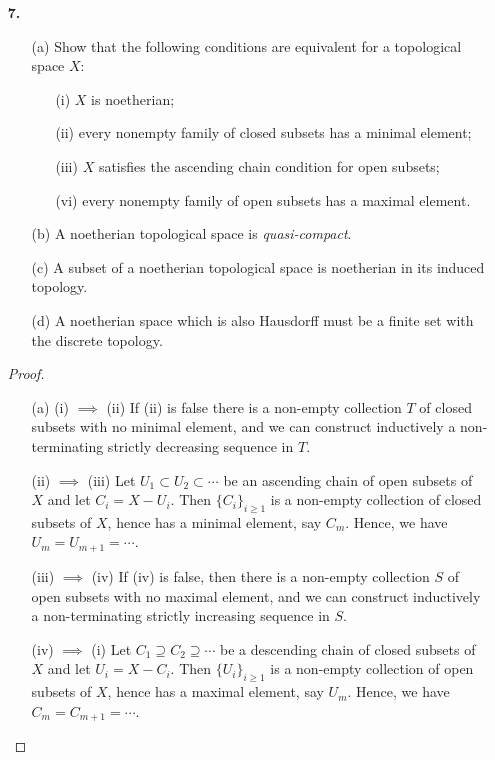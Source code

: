 \documentclass{article}
\begin{document}
\begin{enumerate} [label=\textbf{\arabic*.}, leftmargin=0em]
\item[\textbf{7.}]
\begin{itemize}
    \item[(a)] Show that the following conditions are equivalent for a topological space $X$:
    \begin{itemize}
        \item[(i)] $X$ is noetherian;
        \item[(ii)] every nonempty family of closed subsets has a minimal element;
        \item[(iii)] $X$ satisfies the ascending chain condition for open subsets;
        \item[(vi)] every nonempty family of open subsets has a maximal element.
    \end{itemize}

    \item[(b)] A noetherian topological space is \textit{quasi-compact}.

    \item[(c)] A subset of a noetherian topological space is noetherian in its induced topology.

    \item[(d)] A noetherian space which is also Hausdorff must be a finite set with the discrete topology.
\end{itemize}

\begin{proof} $ $ \vspace{0pt}
   \begin{itemize} [leftmargin=0cm]
    \item[(a)] (i) $\implies$ (ii) If (ii) is false there is a non-empty collection $T$ of closed subsets with no minimal element, and we can construct inductively a non-terminating strictly decreasing sequence in $T$.

    (ii) $\implies$ (iii) Let $U_1 \subset U_2 \subset \cdots$ be an ascending chain of open subsets of $X$ and let $C_i = X - U_i$. Then $\{ C_i \}_{i \geq 1}$ is a non-empty collection of closed subsets of $X$, hence has a minimal element, say $C_m$. Hence, we have $U_m = U_{m + 1} = \cdots$.

    (iii) $\implies$ (iv) If (iv) is false, then there is a non-empty collection $S$ of open subsets with no maximal element, and we can construct inductively a non-terminating strictly increasing sequence in $S$.

    (iv) $\implies$ (i) Let $C_1 \supseteq C_2 \supseteq \cdots$ be a descending chain of closed subsets of $X$ and let $U_i = X - C_i$. Then $\{ U_i \}_{i \geq 1}$ is a non-empty collection of open subsets of $X$, hence has a maximal element, say $U_m$. Hence, we have $C_m = C_{m + 1} = \cdots$.


\end{itemize}
\end{proof}
\end{enumerate}
\end{document}
